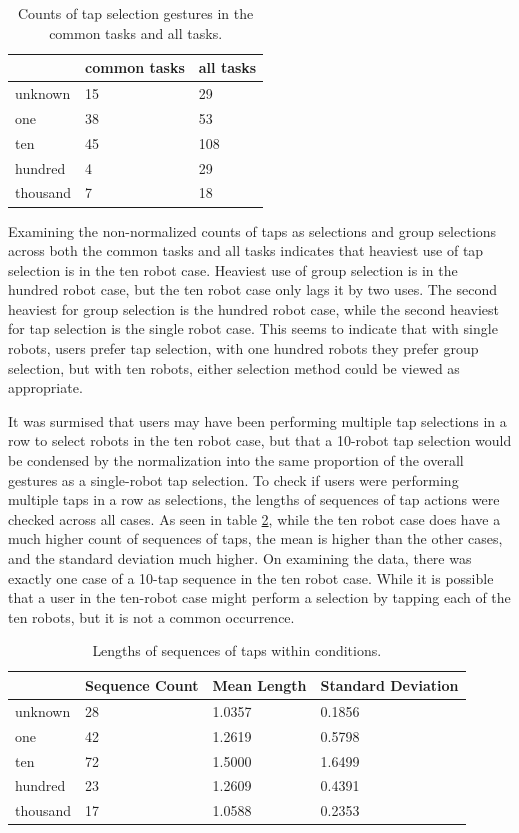 \begin{table}
	\begin{tabular}{l | l l}
		& common tasks & all tasks\\
		\hline
		unknown & 15 & 29\\
		one & 38 & 53 \\
		ten & 45 & 108\\
		hundred & 4 & 29 \\
		thousand & 7 & 18\\
	\end{tabular}
	\caption{Counts of tap selection gestures in the common tasks and all tasks.}
	\label{tab:tap_raw_counts}
\end{table}

Examining the non-normalized counts of taps as selections and group selections across both the common tasks and all tasks indicates that heaviest use of tap selection is in the ten robot case. Heaviest use of group selection is in the hundred robot case, but the ten robot case only lags it by two uses. The second heaviest for group selection is the hundred robot case, while the second heaviest for tap selection is the single robot case. This seems to indicate that with single robots, users prefer tap selection, with one hundred robots they prefer group selection, but with ten robots, either selection method could be viewed as appropriate. 

It was surmised that users may have been performing multiple tap selections in a row to select robots in the ten robot case, but that a 10-robot tap selection would be condensed by the normalization into the same proportion of the overall gestures as a single-robot tap selection. 
To check if users were performing multiple taps in a row as selections, the lengths of sequences of tap actions were checked across all cases. 
As seen in table \ref{tab:tap_seq_len}, while the ten robot case does have a much higher count of sequences of taps, the mean is higher than the other cases, and the standard deviation much higher. 
On examining the data, there was exactly one case of a 10-tap sequence in the ten robot case.
While it is possible that a user in the ten-robot case might perform a selection by tapping each of the ten robots, but it is not a common occurrence. 

\begin{table}
	\begin{tabular}{l | l l l}
		& Sequence Count & Mean Length & Standard Deviation \\ 
		\hline
		unknown & 28 & 1.0357 & 0.1856 \\
		one & 42 & 1.2619 & 0.5798\\
		ten & 72 & 1.5000 & 1.6499\\
		hundred & 23 & 1.2609 & 0.4391\\
		thousand & 17 & 1.0588 & 0.2353\\
	\end{tabular}
	\caption{Lengths of sequences of taps within conditions.}
	\label{tab:tap_seq_len}
\end{table}

